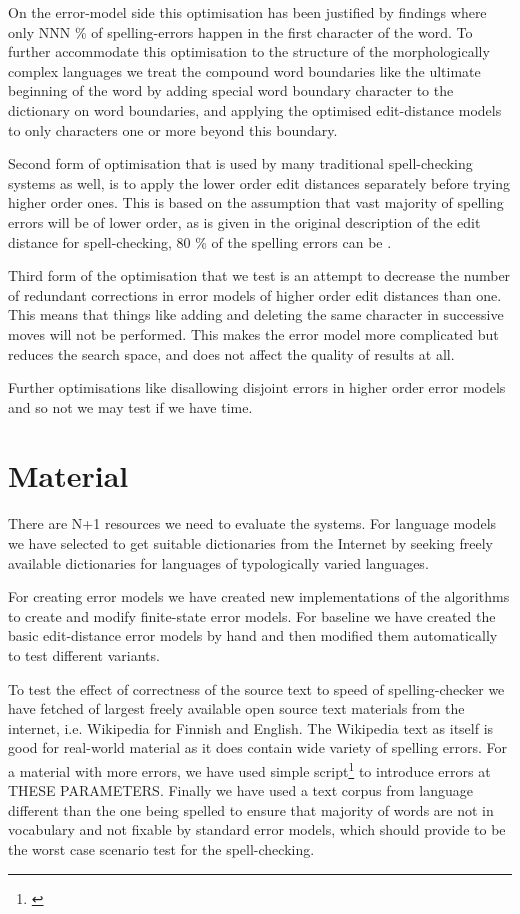 \documentclass[11pt]{article}
\begin{document}
On the error-model side this optimisation has been
justified by findings where only NNN \% of spelling-errors happen in the first
character of the word\cite{Yannakoudakis/1983}. To further accommodate this
optimisation to the structure of the morphologically complex languages we treat
the compound word boundaries like the ultimate beginning of the word by adding
special word boundary character to the dictionary on word boundaries, and
applying the optimised edit-distance models to only characters one or more
beyond this boundary.

Second form of optimisation that is used by many traditional spell-checking
systems as well, is to apply the lower order edit distances separately before
trying higher order ones. This is based on the assumption that vast majority
of spelling errors will be of lower order, as is given in the original
description of the edit distance for spell-checking, 80 \% of the spelling
errors can be \cite{Pollock/1984}.

Third form of the optimisation that we test is an attempt to decrease the
number of redundant corrections in error models of higher order edit distances
than one. This means that things like  adding and deleting the
same character in successive moves will not be performed. This makes the error
model more complicated but reduces the search space, and does not affect the
quality of results at all.

Further optimisations like disallowing disjoint errors in higher order error
models and so not we may test if we have time.



\section{Material}
\label{sec:materials}

There are N+1 resources we need to evaluate the systems. For language models
we have selected to get suitable dictionaries from the Internet by seeking
freely available dictionaries for languages of typologically varied
languages.

For creating error models we have created new implementations of the algorithms
to create and modify finite-state error models. For baseline we have created
the basic edit-distance error models by hand and then modified them
automatically to test different variants.

To test the effect of correctness of the source text to speed of
spelling-checker we have fetched of largest freely available open source text
materials from the internet, i.e. Wikipedia for Finnish and English. The
Wikipedia text as itself is good for real-world material as it does contain
wide variety of spelling errors. For a material with more errors, we have used
simple script\footnote{\url{}} to introduce errors at THESE PARAMETERS. Finally
we have used a text corpus from language different than the one being spelled
to ensure that majority of words are not in vocabulary and not fixable by
standard error models, which should provide to be the worst case scenario test
for the spell-checking.
\end{document}
